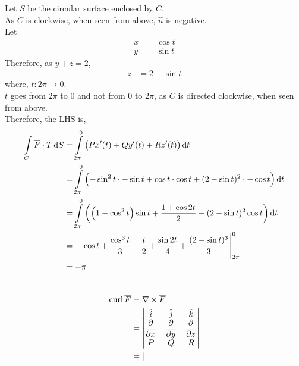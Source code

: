 \documentclass[fleqn, a4paper, 12pt, twoside]{article}
\theoremstyle{definition}
\theoremstyle{theorem}
\newcommand{\curl}{\mathrm{curl\,}}
\begin{document}
{\begin{solution}
	Let $S$ be the circular surface enclosed by $C$.\\
	As $C$ is clockwise, when seen from above, $\hat{n}$ is negative.\\
	Let
	\begin{align*}
		x & = \cos t \\
		y & = \sin t
	\end{align*}
	Therefore, as $y + z = 2$,
	\begin{align*}
		z & = 2 - \sin t
	\end{align*}
	where, $t : 2 \pi \to 0$.\\
	$t$ goes from $2 \pi$ to $0$ and not from $0$ to $2 \pi$, as $C$ is directed clockwise, when seen from above.\\
	Therefore, the LHS is,
	\begin{align*}
		\int\limits_{C} \overline{F} \cdot \hat{T} \dif S & = \int\limits_{2 \pi}^{0} \left( P x'(t) + Q y'(t) + R z'(t) \right) \dif t                                                         \\
                                                                  & = \int\limits_{2 \pi}^{0} \left( -\sin^2 t \cdot -\sin t + \cos t \cdot \cos t + (2 - \sin t)^2 \cdot -\cos t \right) \dif t        \\
                                                                  & = \int\limits_{2 \pi}^{0} \left( \left( 1 - \cos^2 t \right) \sin t + \frac{1 + \cos 2 t}{2} - (2 - \sin t)^2 \cos t \right) \dif t \\
                                                                  & = \left. -\cos t + \frac{\cos^3 t}{3} + \frac{t}{2} + \frac{\sin 2 t}{4} + \frac{(2 - \sin t)^3}{3} \right|_{2 \pi}^{0}             \\
                                                                  & = -\pi
	\end{align*}
	~\\
	\begin{align*}
		\curl \overline{F} &= \nabla \times \overline{F}\\
		                   &=
			\begin{vmatrix}
				\hat{i}   & \hat{j}   & \hat{k}   \\
				\dpd{}{x} & \dpd{}{y} & \dpd{}{z} \\
				P         & Q         & R
			\end{vmatrix}\\
		                   &=
			\begin{vmatrix}

\end{vmatrix}
\end{align*}
\end{solution}}
\end{document}

